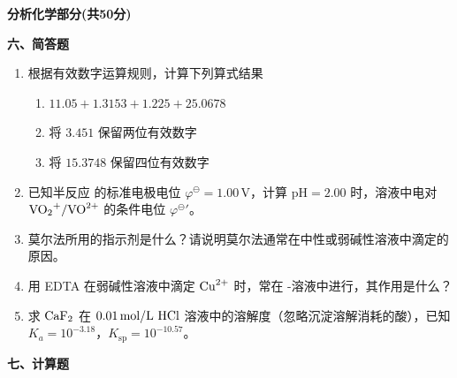 \vspace{1cm}
\begin{center}
    {\Large \textbf{分析化学部分(共50分)}}
\end{center}


\vspace{0.5cm}
\noindent\textbf{六、简答题}

\begin{enumerate}[label=\arabic*., itemsep=1.5ex]
    \item 根据有效数字运算规则，计算下列算式结果
    \begin{enumerate}[label=(\arabic*), noitemsep, topsep=0pt, partopsep=0pt]
        \item $11.05 + 1.3153 + 1.225 + 25.0678$
        \item 将 $3.451$ 保留两位有效数字
        \item 将 $15.3748$ 保留四位有效数字
    \end{enumerate}
    \item 已知半反应  的标准电极电位 $\varphi^\ominus=1.00\,\text{V}$，计算 $\text{pH}=2.00$ 时，溶液中电对 $\ce{VO2+/VO^{2+}}$ 的条件电位 $\varphi^\ominus{}'$。
    \item 莫尔法所用的指示剂是什么？请说明莫尔法通常在中性或弱碱性溶液中滴定的原因。
    \item 用 EDTA 在弱碱性溶液中滴定 $\ce{Cu^{2+}}$ 时，常在 -溶液中进行，其作用是什么？
    \item 求 $\ce{CaF2}$ 在 $0.01\,\text{mol/L}\ \ce{HCl}$ 溶液中的溶解度（忽略沉淀溶解消耗的酸），已知 $K_a=10^{-3.18}$，$K_{\text{sp}}=10^{-10.57}$。
\end{enumerate}

\vspace{0.5cm}
\noindent\textbf{七、计算题}

